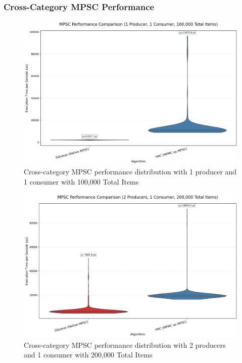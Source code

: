 \subsubsection{Cross-Category MPSC Performance}
\begin{figure}[H]
\centering
\caption{Cross-category MPSC performance distribution with 1 producer and 1 consumer with 100,000 Total Items}
\label{fig:cross-mpsc-violin-1p}
\includegraphics[width=\textwidth]{images/results/best_in_mpsc_performance_violin_1P1C.png}
\end{figure}

\begin{figure}[H]
\centering
\caption{Cross-category MPSC performance distribution with 2 producers and 1 consumer with 200,000 Total Items}
\label{fig:cross-mpsc-violin-2p}
\includegraphics[width=\textwidth]{images/results/best_in_mpsc_performance_violin_2P1C.png}
\end{figure}

